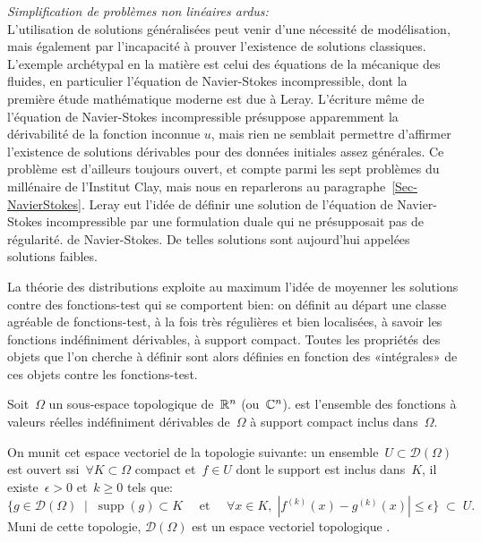 \begin{histoire}
\medskip
\noindent\emph{Simplification de problèmes non linéaires ardus:}\\
L'utilisation de solutions généralisées peut venir d'une nécessité de modélisation, mais également par l'incapacité à prouver l'existence de solutions classiques. L'exemple archétypal en la matière est celui des équations de la mécanique des fluides, en particulier l'équation de Navier-Stokes incompressible, dont la première étude mathématique moderne est due à Leray. L'écriture même de l'équation de Navier-Stokes incompressible présuppose apparemment la dérivabilité de la fonction inconnue $u$, mais rien ne semblait permettre d'affirmer l'existence de solutions dérivables pour des données initiales assez générales. Ce problème est d'ailleurs toujours ouvert, et compte parmi les sept problèmes du millénaire de l'Institut Clay, mais nous en reparlerons au paragraphe~\ref{Sec-NavierStokes}. Leray eut l'idée de définir une solution de l'équation de Navier-Stokes incompressible par une formulation duale qui ne présupposait pas de régularité. de Navier-Stokes. De telles solutions sont aujourd'hui appelées solutions faibles.

\medskip
La théorie des distributions exploite au maximum l'idée de moyenner les solutions contre des fonctions-test qui se comportent bien: on définit au départ une classe agréable de fonctions-test, à la fois très régulières et bien localisées, à savoir les fonctions indéfiniment dérivables, à support compact. Toutes les propriétés des objets que l'on cherche à définir sont alors définies en fonction des «intégrales» de ces objets contre les fonctions-test.
\end{histoire}

\medskip
\begin{definition}
Soit~$\Omega$ un sous-espace topologique de~$\mathbb R^n$ (ou~$\mathbb C^n$).
 est l'ensemble des fonctions à valeurs réelles indéfiniment dérivables de~$\Omega$ à support compact inclus dans~$\Omega$.

On munit cet espace vectoriel de la topologie suivante: un ensemble~$U \subset \mathcal{D}(\Omega)$ est ouvert ssi~$\forall K \subset \Omega$ compact et~$f \in U$ dont le support est inclus dans~$K$, il existe~$\epsilon > 0$ et~$k \ge 0$ tels que:
\begin{equation}
  \{ g \in \mathcal{D}(\Omega)\;\mid\; \operatorname{supp}(g) \subset K\quad\text{ et }\quad\forall x \in K,\; |f^{(k)}(x)-g^{(k)}(x)|\le \epsilon \}\;\subset\;U.
\end{equation}
Muni de cette topologie, $\mathcal{D}(\Omega)$ est un espace vectoriel topologique .
\end{definition}

